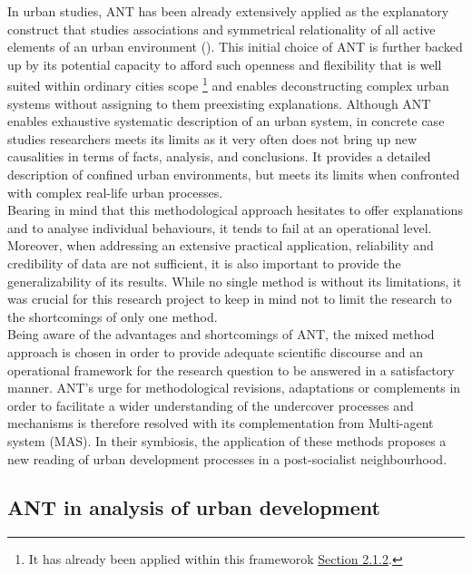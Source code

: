 \documentclass[11pt]{report}
\begin{document}
In urban studies, ANT has been already extensively applied as the explanatory construct that studies associations and symmetrical relationality of all active elements of an urban environment (\href{Farias}{\citealt{farias_introduction:_2011}}).
This initial choice of ANT is further backed up by its
potential capacity to afford such openness and flexibility that is well suited within ordinary cities scope
\footnote{It has already been applied within this frameworok \href{Section 2.1.2}{Section 2.1.2}.} 
and enables deconstructing complex urban systems without assigning to them preexisting explanations.
Although ANT enables exhaustive systematic description of an urban system, in concrete case studies researchers meets its limits as it very often does not bring up new causalities in terms of facts, analysis, and conclusions.
It provides a detailed description of confined urban environments, but meets its limits when confronted with complex real-life urban processes.
\\

Bearing in mind that this methodological approach hesitates to offer explanations and to analyse individual behaviours, it tends to fail at an operational level.
Moreover, when addressing an extensive practical application, reliability and credibility of data are not sufficient, it is also important to provide the generalizability of its results.
While no single method is without its limitations, it was crucial for this research project to keep in mind not to limit the research to the shortcomings of only one method.
\\

Being aware of the advantages and shortcomings of ANT, the mixed method approach is chosen in order to provide adequate scientific discourse and an operational framework for the research question to be answered in a satisfactory manner.
ANT's urge for methodological revisions, adaptations or complements in order to facilitate a wider understanding of the undercover processes and mechanisms is therefore resolved with its complementation from Multi-agent system (MAS).
In their symbiosis, the application of these methods proposes a new reading of urban development processes in a post-socialist neighbourhood.

\subsection{ANT in analysis of urban development}
\end{document}
